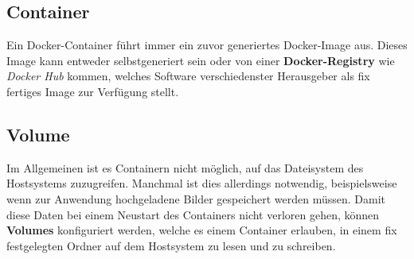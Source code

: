 \subsection{Container}

Ein Docker-Container führt immer ein zuvor generiertes Docker-Image aus. Dieses Image kann entweder selbstgeneriert sein oder von einer \textbf{Docker-Registry} wie \textit{Docker Hub} kommen, welches Software verschiedenster Herausgeber als fix fertiges Image zur Verfügung stellt.

\subsection{Volume}

Im Allgemeinen ist es Containern nicht möglich, auf das Dateisystem des Hostsystems zuzugreifen. Manchmal ist dies allerdings notwendig, beispielsweise wenn zur Anwendung hochgeladene Bilder gespeichert werden müssen. Damit diese Daten bei einem Neustart des Containers nicht verloren gehen, können \textbf{Volumes} konfiguriert werden, welche es einem Container erlauben, in einem fix festgelegten Ordner auf dem Hostsystem zu lesen und zu schreiben.